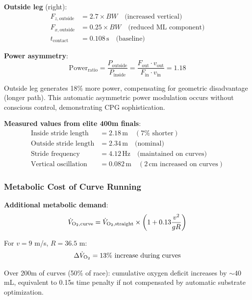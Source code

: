 \documentclass[11pt,onecolumn]{article}
\begin{document}
\textbf{Outside leg} (right):
\begin{align}
F_{z,\text{outside}} &= 2.7 \times BW \quad \text{(increased vertical)} \\
F_{x,\text{outside}} &= 0.25 \times BW \quad \text{(reduced ML component)} \\
t_{\text{contact}} &= 0.108\,\text{s} \quad \text{(baseline)}
\end{align}

\textbf{Power asymmetry}:
\begin{equation}
\text{Power}_{\text{ratio}} = \frac{P_{\text{outside}}}{P_{\text{inside}}} = \frac{F_{\text{out}} \cdot v_{\text{out}}}{F_{\text{in}} \cdot v_{\text{in}}} = 1.18
\end{equation}

Outside leg generates 18\% more power, compensating for geometric disadvantage (longer path). This automatic asymmetric power modulation occurs without conscious control, demonstrating CPG sophistication.

\textbf{Measured values from elite 400m finals}:
\begin{align}
\text{Inside stride length} &= 2.18\,\text{m} \quad (7\% \text{ shorter}) \\
\text{Outside stride length} &= 2.34\,\text{m} \quad \text{(nominal)} \\
\text{Stride frequency} &= 4.12\,\text{Hz} \quad \text{(maintained on curves)} \\
\text{Vertical oscillation} &= 0.082\,\text{m} \quad (2\,\text{cm} \text{ increased on curves})
\end{align}

\subsubsection{Metabolic Cost of Curve Running}

\textbf{Additional metabolic demand}:
\begin{equation}
\dot{V}_{\ce{O2},\text{curve}} = \dot{V}_{\ce{O2},\text{straight}} \times \left(1 + 0.13 \frac{v^2}{gR}\right)
\end{equation}

For $v = 9$ m/s, $R = 36.5$ m:
\begin{equation}
\Delta\dot{V}_{\ce{O2}} = 13\% \text{ increase during curves}
\end{equation}

Over 200m of curves (50\% of race): cumulative oxygen deficit increases by $\sim$40 mL, equivalent to 0.15s time penalty if not compensated by automatic substrate optimization.
\end{document}

